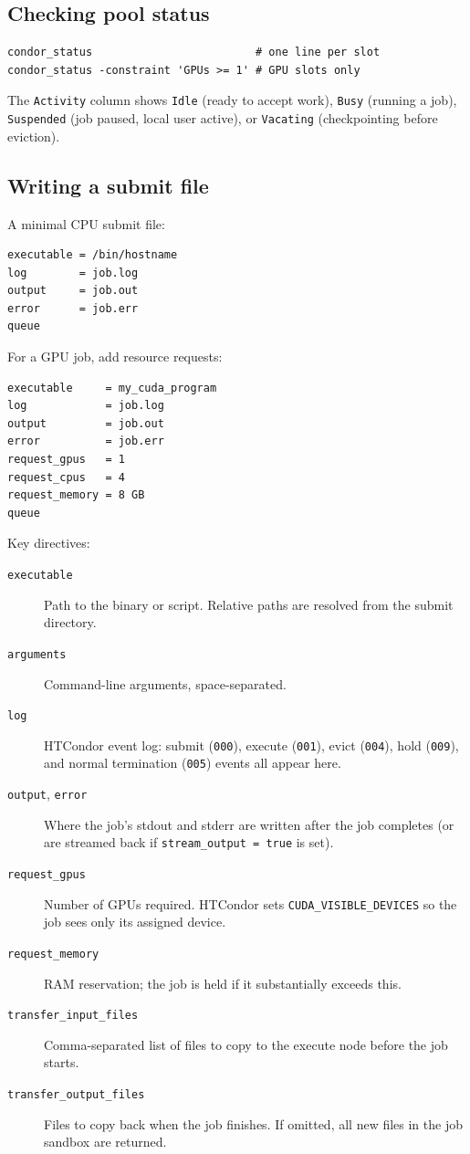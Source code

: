 \documentclass[11pt,a4paper]{article}
\begin{document}
\subsection{Checking pool status}

\begin{verbatim}
condor_status                         # one line per slot
condor_status -constraint 'GPUs >= 1' # GPU slots only
\end{verbatim}

The \texttt{Activity} column shows \texttt{Idle} (ready to accept work),
\texttt{Busy} (running a job), \texttt{Suspended} (job paused, local user
active), or \texttt{Vacating} (checkpointing before eviction).

\subsection{Writing a submit file}

A minimal CPU submit file:

\begin{verbatim}
executable = /bin/hostname
log        = job.log
output     = job.out
error      = job.err
queue
\end{verbatim}

For a GPU job, add resource requests:

\begin{verbatim}
executable     = my_cuda_program
log            = job.log
output         = job.out
error          = job.err
request_gpus   = 1
request_cpus   = 4
request_memory = 8 GB
queue
\end{verbatim}

Key directives:

\begin{description}
  \item[\texttt{executable}] Path to the binary or script.  Relative paths are
        resolved from the submit directory.
  \item[\texttt{arguments}] Command-line arguments, space-separated.
  \item[\texttt{log}] HTCondor event log: submit (\texttt{000}), execute
        (\texttt{001}), evict (\texttt{004}), hold (\texttt{009}), and
        normal termination (\texttt{005}) events all appear here.
  \item[\texttt{output}, \texttt{error}] Where the job's stdout and stderr
        are written after the job completes (or are streamed back if
        \texttt{stream\_output = true} is set).
  \item[\texttt{request\_gpus}] Number of GPUs required.  HTCondor sets
        \texttt{CUDA\_VISIBLE\_DEVICES} so the job sees only its assigned device.
  \item[\texttt{request\_memory}] RAM reservation; the job is held if it
        substantially exceeds this.
  \item[\texttt{transfer\_input\_files}] Comma-separated list of files to copy
        to the execute node before the job starts.
  \item[\texttt{transfer\_output\_files}] Files to copy back when the job
        finishes.  If omitted, all new files in the job sandbox are returned.
\end{description}
\end{document}
